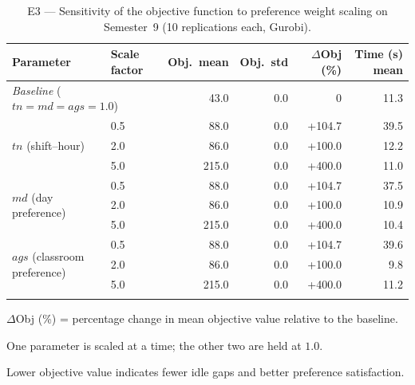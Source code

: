 \begin{table}[htbp]
\centering
\caption{E3 --- Sensitivity of the objective function to preference weight scaling on Semester~9 (10 replications each, Gurobi).}
\label{tab:e3_sensibilidad}
\scriptsize
\begin{tabular}{llrrrr}
\toprule
\textbf{Parameter} & \textbf{Scale factor} & \textbf{Obj.\ mean} & \textbf{Obj.\ std}
  & \textbf{$\Delta$Obj (\%)} & \textbf{Time (s) mean} \\
\midrule
  \multicolumn{2}{l}{\textit{Baseline} ($tn=md=ags=1.0$)} & 43.0 & 0.0 & 0 & 11.3 \\
  \midrule
  \multirow{3}{*}{$tn$ (shift--hour)} & 0.5 & 88.0 & 0.0 & +104.7 & 39.5 \\
   & 2.0 & 86.0 & 0.0 & +100.0 & 12.2 \\
   & 5.0 & 215.0 & 0.0 & +400.0 & 11.0 \\
  \midrule
  \multirow{3}{*}{$md$ (day preference)} & 0.5 & 88.0 & 0.0 & +104.7 & 37.5 \\
   & 2.0 & 86.0 & 0.0 & +100.0 & 10.9 \\
   & 5.0 & 215.0 & 0.0 & +400.0 & 10.4 \\
  \midrule
  \multirow{3}{*}{$ags$ (classroom preference)} & 0.5 & 88.0 & 0.0 & +104.7 & 39.6 \\
   & 2.0 & 86.0 & 0.0 & +100.0 & 9.8 \\
   & 5.0 & 215.0 & 0.0 & +400.0 & 11.2 \\
\botrule
\end{tabular}
\begin{tablenotes}
\small
\item $\Delta$Obj (\%) = percentage change in mean objective value relative to the baseline.
\item One parameter is scaled at a time; the other two are held at $1.0$.
\item Lower objective value indicates fewer idle gaps and better preference satisfaction.
\end{tablenotes}
\end{table}

